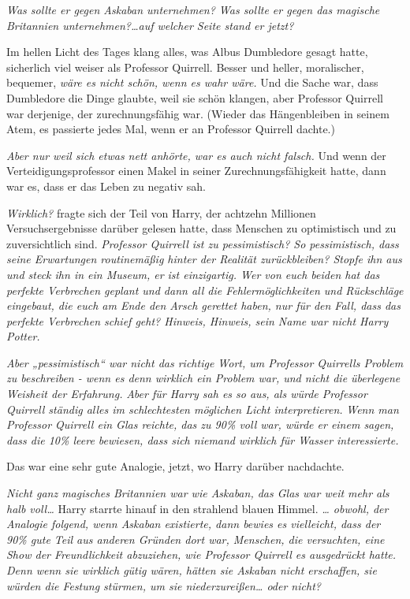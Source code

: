 {\emph{Was sollte er gegen Askaban unternehmen? Was sollte er gegen das magische Britannien unternehmen?…auf welcher Seite stand er jetzt?}

Im hellen Licht des Tages klang alles, was Albus Dumbledore gesagt hatte, sicherlich viel weiser als Professor Quirrell. Besser und heller, moralischer, bequemer, \emph{wäre es nicht schön, wenn es wahr wäre.} Und die Sache war, dass Dumbledore die Dinge glaubte, weil sie schön klangen, aber Professor Quirrell war derjenige, der zurechnungsfähig war. (Wieder das Hängenbleiben in seinem Atem, es passierte jedes Mal, wenn er an Professor Quirrell dachte.)

\emph{Aber nur weil sich etwas nett anhörte, war es auch nicht falsch.} Und wenn der Verteidigungsprofessor einen Makel in seiner Zurechnungsfähigkeit hatte, dann war es, dass er das Leben zu negativ sah.

\emph{Wirklich?} fragte sich der Teil von Harry, der achtzehn Millionen Versuchsergebnisse darüber gelesen hatte, dass Menschen zu optimistisch und zu zuversichtlich sind. \emph{Professor Quirrell ist zu pessimistisch? So pessimistisch, dass seine Erwartungen routinemäßig hinter der Realität zurückbleiben? Stopfe ihn aus und steck ihn in ein Museum, er ist einzigartig. Wer von euch beiden hat das perfekte Verbrechen geplant und dann all die Fehlermöglichkeiten und Rückschläge eingebaut, die euch am Ende den Arsch gerettet haben, nur für den Fall, dass das perfekte Verbrechen schief geht? Hinweis, Hinweis, sein Name war nicht Harry Potter.}

\emph{Aber „pessimistisch“ war nicht das richtige Wort, um Professor Quirrells Problem zu beschreiben - wenn es denn wirklich ein Problem war, und nicht die überlegene Weisheit der Erfahrung.} \emph{Aber für Harry sah es so aus, als würde Professor Quirrell ständig alles im schlechtesten möglichen Licht interpretieren.} \emph{Wenn man Professor Quirrell ein Glas reichte, das zu 90\% voll war, würde er einem sagen, dass die 10\% leere bewiesen, dass sich niemand wirklich für Wasser interessierte.}

Das war eine sehr gute Analogie, jetzt, wo Harry darüber nachdachte.

\emph{Nicht ganz magisches Britannien war wie Askaban, das Glas war weit mehr als halb voll…} Harry starrte hinauf in den strahlend blauen Himmel. \emph{… obwohl, der Analogie folgend, wenn Askaban existierte, dann bewies es vielleicht, dass der 90\% gute Teil aus anderen Gründen dort war, Menschen, die versuchten, eine Show der Freundlichkeit abzuziehen, wie Professor Quirrell es ausgedrückt hatte. Denn wenn sie wirklich gütig wären, hätten sie Askaban nicht erschaffen, sie würden die Festung stürmen, um sie niederzureißen… oder nicht?}

}
